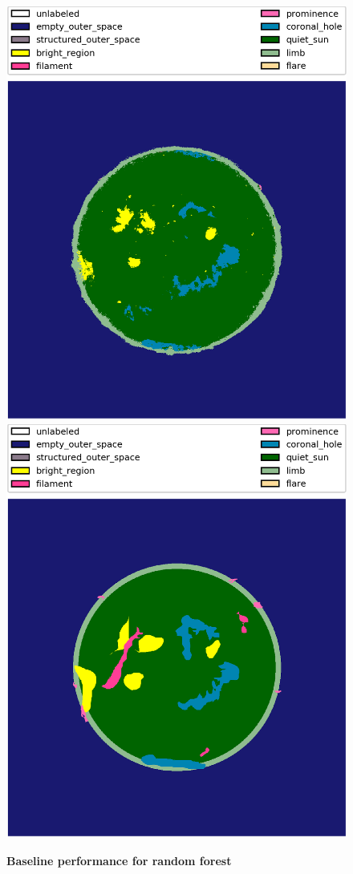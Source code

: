 \documentclass[twoside]{report}
\begin{document}
\begin{figure}[ht]
  \begin{center}
    \includegraphics[scale=0.2]{base_rf}
    \includegraphics[scale=0.2]{base_rf_gold}
    \caption{{\bf Baseline performance for random forest}}
    \label{fig:base-rf}
 \end{center}
\end{figure}
\end{document}
